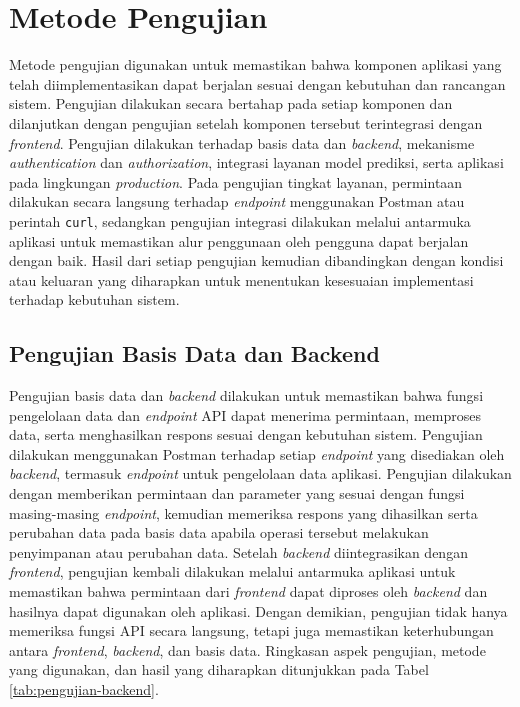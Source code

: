 \section{Metode Pengujian}

Metode pengujian digunakan untuk memastikan bahwa komponen aplikasi yang telah diimplementasikan dapat berjalan sesuai dengan kebutuhan dan rancangan sistem. Pengujian dilakukan secara bertahap pada setiap komponen dan dilanjutkan dengan pengujian setelah komponen tersebut terintegrasi dengan \textit{frontend}. Pengujian dilakukan terhadap basis data dan \textit{backend}, mekanisme \textit{authentication} dan \textit{authorization}, integrasi layanan model prediksi, serta aplikasi pada lingkungan \textit{production}. Pada pengujian tingkat layanan, permintaan dilakukan secara langsung terhadap \textit{endpoint} menggunakan Postman atau perintah \texttt{curl}, sedangkan pengujian integrasi dilakukan melalui antarmuka aplikasi untuk memastikan alur penggunaan oleh pengguna dapat berjalan dengan baik. Hasil dari setiap pengujian kemudian dibandingkan dengan kondisi atau keluaran yang diharapkan untuk menentukan kesesuaian implementasi terhadap kebutuhan sistem.

\subsection{Pengujian Basis Data dan Backend}

Pengujian basis data dan \textit{backend} dilakukan untuk memastikan bahwa fungsi pengelolaan data dan \textit{endpoint} API dapat menerima permintaan, memproses data, serta menghasilkan respons sesuai dengan kebutuhan sistem. Pengujian dilakukan menggunakan Postman terhadap setiap \textit{endpoint} yang disediakan oleh \textit{backend}, termasuk \textit{endpoint} untuk pengelolaan data aplikasi. Pengujian dilakukan dengan memberikan permintaan dan parameter yang sesuai dengan fungsi masing-masing \textit{endpoint}, kemudian memeriksa respons yang dihasilkan serta perubahan data pada basis data apabila operasi tersebut melakukan penyimpanan atau perubahan data. Setelah \textit{backend} diintegrasikan dengan \textit{frontend}, pengujian kembali dilakukan melalui antarmuka aplikasi untuk memastikan bahwa permintaan dari \textit{frontend} dapat diproses oleh \textit{backend} dan hasilnya dapat digunakan oleh aplikasi. Dengan demikian, pengujian tidak hanya memeriksa fungsi API secara langsung, tetapi juga memastikan keterhubungan antara \textit{frontend}, \textit{backend}, dan basis data. Ringkasan aspek pengujian, metode yang digunakan, dan hasil yang diharapkan ditunjukkan pada Tabel \ref{tab:pengujian-backend}.


